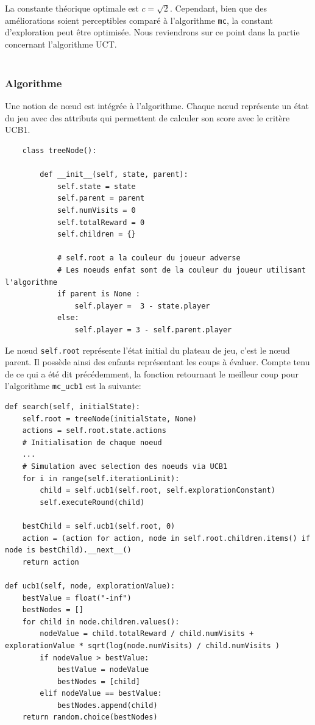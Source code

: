 \documentclass[a4paper]{article}
\theoremstyle{definition}
\begin{document}
La constante théorique optimale est $c=\sqrt{2}$. Cependant, bien que des améliorations soient perceptibles comparé à l'algorithme \texttt{mc}, la constant d'exploration peut être optimisée. Nous reviendrons sur ce point dans la partie concernant l'algorithme UCT. \\ \\
 

\newpage
\subsubsection{Algorithme}

Une notion de nœud est intégrée à l'algorithme. Chaque nœud représente un état du jeu avec des attributs qui permettent de calculer son score avec le critère UCB1.

\begin{lstlisting}
	class treeNode():
	
		def __init__(self, state, parent):
			self.state = state
			self.parent = parent
			self.numVisits = 0
			self.totalReward = 0
			self.children = {}
			
			# self.root a la couleur du joueur adverse 
			# Les noeuds enfat sont de la couleur du joueur utilisant l'algorithme
			if parent is None : 
				self.player =  3 - state.player
			else:
				self.player = 3 - self.parent.player
\end{lstlisting}

Le nœud \texttt{self.root} représente l'état initial du plateau de jeu, c'est le nœud parent. Il possède ainsi des enfants représentant les coups à évaluer. Compte tenu de ce qui a été dit précédemment, la fonction retournant le meilleur coup pour l'algorithme \texttt{mc\_ucb1} est la suivante:

\begin{lstlisting}
def search(self, initialState):
	self.root = treeNode(initialState, None)
	actions = self.root.state.actions
	# Initialisation de chaque noeud
	...
	# Simulation avec selection des noeuds via UCB1
	for i in range(self.iterationLimit):
		child = self.ucb1(self.root, self.explorationConstant)
		self.executeRound(child)
		
	bestChild = self.ucb1(self.root, 0)
	action = (action for action, node in self.root.children.items() if node is bestChild).__next__()
	return action
	
def ucb1(self, node, explorationValue):
	bestValue = float("-inf")
	bestNodes = []
	for child in node.children.values():
		nodeValue = child.totalReward / child.numVisits + explorationValue * sqrt(log(node.numVisits) / child.numVisits )
		if nodeValue > bestValue:
			bestValue = nodeValue
			bestNodes = [child]
		elif nodeValue == bestValue:
			bestNodes.append(child)
	return random.choice(bestNodes)
\end{lstlisting}
\end{document}
